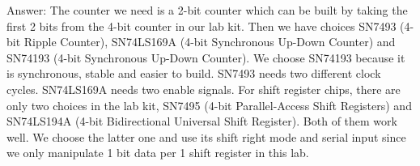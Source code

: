 \documentclass[12pt]{article}
\begin{document}
Answer: The counter we need is a 2-bit counter which can be built by taking the first 2 bits from the 4-bit counter in our lab kit. Then we have choices SN7493 (4-bit Ripple Counter), SN74LS169A (4-bit Synchronous Up-Down Counter) and SN74193 (4-bit Synchronous Up-Down Counter). We choose SN74193 because it is synchronous, stable and easier to build. SN7493 needs two different clock cycles. SN74LS169A needs two enable signals. For shift register chips, there are only two choices in the lab kit, SN7495 (4-bit Parallel-Access Shift Registers) and SN74LS194A (4-bit Bidirectional Universal Shift Register). Both of them work well. We choose the latter one and use its shift right mode and serial input since we only manipulate 1 bit data per 1 shift register in this lab.

\newpage


\end{document}
